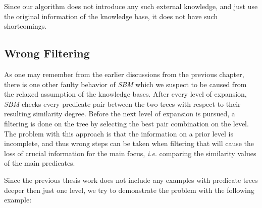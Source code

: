 Since our algorithm does not introduce any such external knowledge, and just use the original information of the knowledge base, it does not have such shortcomings.













\subsection{Wrong Filtering}
\label{filt2}

As one may remember from the earlier discussions from the previous chapter, there is one other faulty behavior of \textit{SBM} which we suspect to  be caused from the relaxed assumption of the knowledge bases. After every level of expansion, \textit{SBM} checks every predicate pair between the two trees with respect to their resulting similarity degree. Before the next level of expansion is pursued, a filtering is done on the tree by selecting the best pair combination on the level. The problem with this approach is that the information on a prior level is incomplete, and thus wrong steps can be taken when filtering that will cause the loss of crucial information for the main focus, \textit{i.e}. comparing the similarity values of the main predicates.  

Since the previous thesis work does not include any examples with predicate trees deeper then just one level, we try to demonstrate the problem with the following example:




